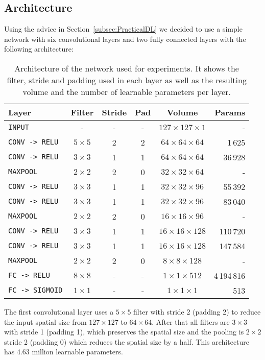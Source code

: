 	\subsection{Architecture}
	Using the advice in Section~\ref{subsec:PracticalDL} we decided to use a simple network with six convolutional layers and two fully connected layers with the following architecture:
	\begin{table}[h]
		\centering
		\begin{tabular}{lccccr}
		\hline
		\textbf{Layer} & \textbf{Filter} & \textbf{Stride} &\textbf{Pad} & \textbf{Volume} & \textbf{Params} \\
		\hline
		\texttt{INPUT}	& -	& - & - & $127 \times 127 \times 1$ & -\\
		\texttt{CONV -> RELU} & $5 \times 5$ & 2 & 2 & $64 \times 64 \times 64$ & 1\,625\\
		\texttt{CONV -> RELU} & $3 \times 3$ & 1 & 1 & $64 \times 64 \times 64$ & 36\,928\\
		\texttt{MAXPOOL} & $2 \times 2$ & 2 & 0 & $32 \times 32 \times 64$ & -\\
		\texttt{CONV -> RELU} & $3 \times 3$ & 1 & 1 & $32 \times 32 \times 96$ & 55\,392\\
		\texttt{CONV -> RELU} & $3 \times 3$ & 1 & 1 & $32 \times 32 \times 96$ & 83\,040\\
		\texttt{MAXPOOL} & $2 \times 2$ & 2 & 0 & $16 \times 16 \times 96$ & -\\
		\texttt{CONV -> RELU} & $3 \times 3$ & 1 & 1 & $16 \times 16 \times 128$ & 110\,720\\
		\texttt{CONV -> RELU} & $3 \times 3$ & 1 & 1 & $16 \times 16 \times 128$ & 147\,584\\
		\texttt{MAXPOOL} & $2 \times 2$ & 2 & 0 & $8 \times 8 \times 128$ & -\\
		\texttt{FC -> RELU} & $8 \times 8$ & - & - & $1 \times 1 \times 512$ & 4\,194\,816\\
		\texttt{FC -> SIGMOID} & $1 \times 1$ & - & - & $1 \times 1 \times 1$ & 513 \\
		\hline
		\end{tabular}
		\label{tab:convNetArchitecture}
		\caption[Selected convolutional network architecture]{Architecture of the network used for experiments. It shows the filter, stride and padding used in each layer as well as the resulting volume and the number of learnable parameters per layer.}
	\end{table}

	The first convolutional layer uses a $5 \times 5$ filter with stride 2 (padding 2) to reduce the input spatial size from $127 \times 127$ to $64 \times 64$. After that all filters are $3 \times 3$ with stride 1 (padding 1), which preserves the spatial size and the pooling is $2\times 2$ stride 2 (padding 0) which reduces the spatial size by a half. This architecture has 4.63 million learnable parameters. 

